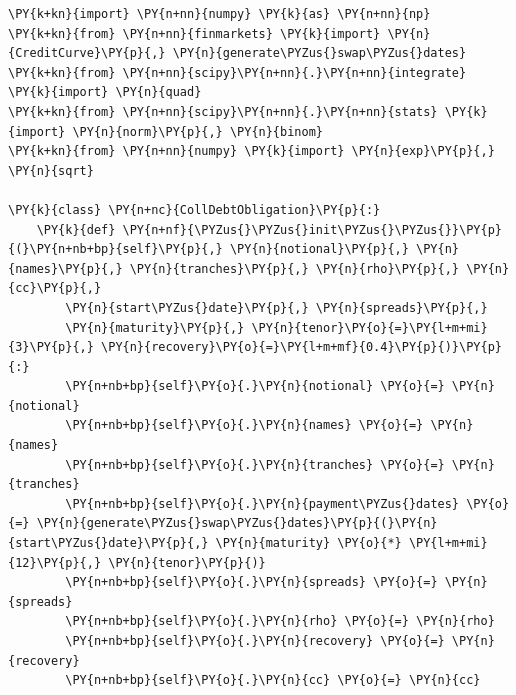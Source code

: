 \begin{tcolorbox}[breakable, size=fbox, boxrule=1pt, pad at break*=1mm,colback=cellbackground, colframe=cellborder]
\begin{Verbatim}[commandchars=\\\{\}]
\PY{k+kn}{import} \PY{n+nn}{numpy} \PY{k}{as} \PY{n+nn}{np}
\PY{k+kn}{from} \PY{n+nn}{finmarkets} \PY{k}{import} \PY{n}{CreditCurve}\PY{p}{,} \PY{n}{generate\PYZus{}swap\PYZus{}dates}
\PY{k+kn}{from} \PY{n+nn}{scipy}\PY{n+nn}{.}\PY{n+nn}{integrate} \PY{k}{import} \PY{n}{quad}
\PY{k+kn}{from} \PY{n+nn}{scipy}\PY{n+nn}{.}\PY{n+nn}{stats} \PY{k}{import} \PY{n}{norm}\PY{p}{,} \PY{n}{binom}
\PY{k+kn}{from} \PY{n+nn}{numpy} \PY{k}{import} \PY{n}{exp}\PY{p}{,} \PY{n}{sqrt}
		
\PY{k}{class} \PY{n+nc}{CollDebtObligation}\PY{p}{:}
    \PY{k}{def} \PY{n+nf}{\PYZus{}\PYZus{}init\PYZus{}\PYZus{}}\PY{p}{(}\PY{n+nb+bp}{self}\PY{p}{,} \PY{n}{notional}\PY{p}{,} \PY{n}{names}\PY{p}{,} \PY{n}{tranches}\PY{p}{,} \PY{n}{rho}\PY{p}{,} \PY{n}{cc}\PY{p}{,}
        \PY{n}{start\PYZus{}date}\PY{p}{,} \PY{n}{spreads}\PY{p}{,}
        \PY{n}{maturity}\PY{p}{,} \PY{n}{tenor}\PY{o}{=}\PY{l+m+mi}{3}\PY{p}{,} \PY{n}{recovery}\PY{o}{=}\PY{l+m+mf}{0.4}\PY{p}{)}\PY{p}{:}
        \PY{n+nb+bp}{self}\PY{o}{.}\PY{n}{notional} \PY{o}{=} \PY{n}{notional}
        \PY{n+nb+bp}{self}\PY{o}{.}\PY{n}{names} \PY{o}{=} \PY{n}{names}
        \PY{n+nb+bp}{self}\PY{o}{.}\PY{n}{tranches} \PY{o}{=} \PY{n}{tranches}
        \PY{n+nb+bp}{self}\PY{o}{.}\PY{n}{payment\PYZus{}dates} \PY{o}{=} \PY{n}{generate\PYZus{}swap\PYZus{}dates}\PY{p}{(}\PY{n}{start\PYZus{}date}\PY{p}{,} \PY{n}{maturity} \PY{o}{*} \PY{l+m+mi}{12}\PY{p}{,} \PY{n}{tenor}\PY{p}{)}
        \PY{n+nb+bp}{self}\PY{o}{.}\PY{n}{spreads} \PY{o}{=} \PY{n}{spreads}
        \PY{n+nb+bp}{self}\PY{o}{.}\PY{n}{rho} \PY{o}{=} \PY{n}{rho}
        \PY{n+nb+bp}{self}\PY{o}{.}\PY{n}{recovery} \PY{o}{=} \PY{n}{recovery}
        \PY{n+nb+bp}{self}\PY{o}{.}\PY{n}{cc} \PY{o}{=} \PY{n}{cc}
		

\end{Verbatim}
\end{tcolorbox}
